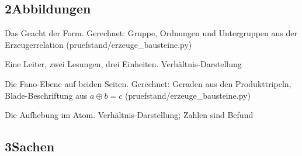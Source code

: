 \documentclass[11pt,a4paper]{article}
\begin{document}
\subsection*{2\quad Abbildungen}

\begin{description}[itemsep=1pt,font=\normalfont\bfseries]
\item[Abb.~\ref{fig:geacht}] Das Geacht der Form. Gerechnet: Gruppe, Ordnungen und Untergruppen aus der Erzeugerrelation (pruefstand/erzeuge\_bausteine.py)
\item[Abb.~\ref{fig:leitern}] Eine Leiter, zwei Lesungen, drei Einheiten. Verhältnis-Darstellung
\item[Abb.~\ref{fig:fano}] Die Fano-Ebene auf beiden Seiten. Gerechnet: Geraden aus den Produkttripeln, Blade-Beschriftung aus $a\oplus b=c$ (pruefstand/erzeuge\_bausteine.py)
\item[Abb.~\ref{fig:atom}] Die Aufhebung im Atom. Verhältnis-Darstellung; Zahlen sind Befund
\end{description}

\subsection*{3\quad Sachen}
\end{document}
